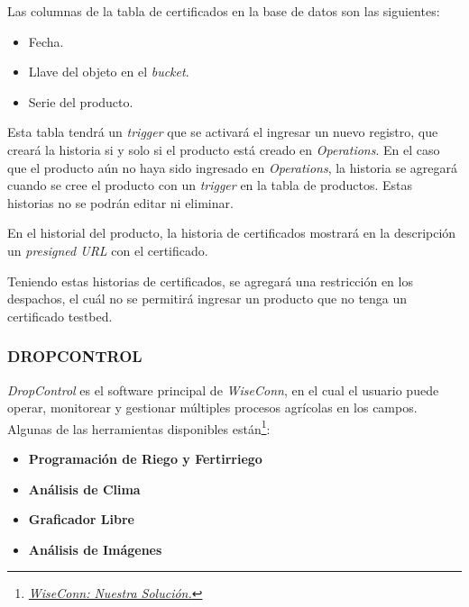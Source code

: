 Las columnas de la tabla de certificados en la base de datos son las siguientes: 
\begin{itemize}
    \item Fecha.
    \item Llave del objeto en el \textit{bucket}.
    \item Serie del producto.
\end{itemize}
Esta tabla tendrá un \textit{trigger} que se activará el ingresar un nuevo registro, que creará la historia si y solo si el producto está creado en \textit{Operations}.
En el caso que el producto aún no haya sido ingresado en \textit{Operations}, la historia se agregará cuando se cree el producto con un \textit{trigger} en la tabla de productos.
Estas historias no se podrán editar ni eliminar.

En el historial del producto, la historia de certificados mostrará en la descripción un \textit{presigned URL} con el certificado.

Teniendo estas historias de certificados, se agregará una restricción en los despachos, el cuál no se permitirá ingresar un producto que no tenga un certificado testbed.
\fi

\subsubsection{DROPCONTROL}

\textit{DropControl} es el software principal de \textit{WiseConn}, en el cual el usuario puede operar, monitorear y gestionar múltiples procesos agrícolas en los campos.
Algunas de las herramientas disponibles están\footnote{\href{https://wiseconn.com/cl/nuestra-solucion/}{\textit{WiseConn: Nuestra Solución.}}}:
\begin{itemize}
    \item \textbf{Programación de Riego y Fertirriego}
    \item \textbf{Análisis de Clima}
    \item \textbf{Graficador Libre}
    \item \textbf{Análisis de Imágenes}
\end{itemize}

